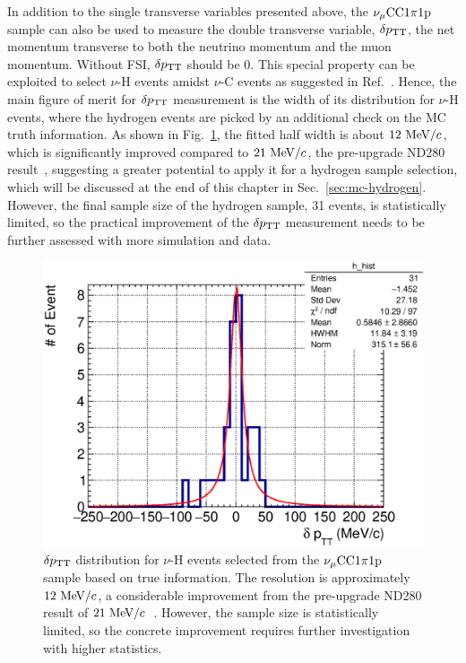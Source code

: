      In addition to the single transverse variables presented above, the $\nu_{\mu}\textrm{CC}1\pi1\textrm{p}$ sample can also be used to measure the double transverse variable, $\delta p_\textrm{TT}$, the net momentum transverse to both the neutrino momentum and the muon momentum.
     Without FSI, $\delta p_\textrm{TT}$ should be $0$. 
     This special property can be exploited to select $\nu$-H events amidst $\nu$-C events as suggested in Ref.~\cite{Lu:2015hea}. 
     Hence, the main figure of merit for $\delta p_\textrm{TT}$ measurement is the width of its distribution for $\nu$-H events, where the hydrogen events are picked by an additional check on the MC truth information.
     As shown in Fig.~\ref{fig:1pi-tki-dptt}, the fitted half width is about $12~\textrm{MeV}/c$, which is significantly improved compared to $21~\textrm{MeV}/c$, the pre-upgrade ND280 result~\cite{Lu:2015hea}, suggesting a greater potential to apply it for a hydrogen sample selection, which will be discussed at the end of this chapter in Sec.~\ref{sec:mc-hydrogen}.
     However, the final sample size of the hydrogen sample, 31 events, is statistically limited, so the practical improvement of the $\delta p_\textrm{TT}$ measurement needs to be further assessed with more simulation and data.
     \begin{figure}[!htb] 
          \centering 		
          \includegraphics[width=\sgfigwid\textwidth]{figures/perf/tki/SFGpTPCmu_dptt_hist_al15_H_bin100_range500_Lfit.eps}
          \caption{\label{fig:1pi-tki-dptt} $\delta p_\textrm{TT}$ distribution for $\nu$-H events selected from the $\nu_{\mu}\textrm{CC}1\pi1\textrm{p}$ sample based on true information.
          The resolution is approximately $12~\textrm{MeV}/c$, a considerable improvement from the pre-upgrade ND280 result of $21~\textrm{MeV}/c$~\cite{Lu:2015hea}.
          However, the sample size is statistically limited, so the concrete improvement requires further investigation with higher statistics.} 
     \end{figure}


